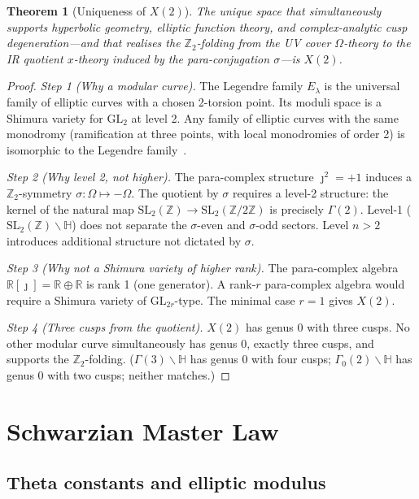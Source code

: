 \documentclass[12pt]{article}
\theoremstyle{plain}
\newtheorem{theorem}{Theorem}[section]
\theoremstyle{definition}
\numberwithin{equation}{section}
\newcommand{\R}{\mathbb{R}}
\newcommand{\Z}{\mathbb{Z}}
\newcommand{\HH}{\mathbb{H}}
\begin{document}
\begin{theorem}[Uniqueness of $X(2)$]\label{thm:X2unique}
The unique space that simultaneously supports hyperbolic geometry, elliptic function theory, and complex-analytic cusp degeneration---and that realises the $\Z_2$-folding from the UV cover $\Omega$-theory to the IR quotient $x$-theory induced by the para-conjugation $\sigma$---is $X(2)$.
\end{theorem}

\begin{proof}
\emph{Step 1 (Why a modular curve).}  The Legendre family $E_\lambda$ is the universal family of elliptic curves with a chosen 2-torsion point.  Its moduli space is a Shimura variety for $\mathrm{GL}_2$ at level 2.  Any family of elliptic curves with the same monodromy (ramification at three points, with local monodromies of order 2) is isomorphic to the Legendre family~\cite{Serre}.

\emph{Step 2 (Why level 2, not higher).}  The para-complex structure $\jmath^2=+1$ induces a $\Z_2$-symmetry $\sigma:\Omega\mapsto-\Omega$.  The quotient by $\sigma$ requires a level-2 structure: the kernel of the natural map $\mathrm{SL}_2(\Z)\to\mathrm{SL}_2(\Z/2\Z)$ is precisely $\Gamma(2)$.  Level-1 ($\mathrm{SL}_2(\Z)\backslash\HH$) does not separate the $\sigma$-even and $\sigma$-odd sectors.  Level $n>2$ introduces additional structure not dictated by $\sigma$.

\emph{Step 3 (Why not a Shimura variety of higher rank).}  The para-complex algebra $\R[\jmath]=\R\oplus\R$ is rank 1 (one generator).  A rank-$r$ para-complex algebra would require a Shimura variety of $\mathrm{GL}_{2r}$-type.  The minimal case $r=1$ gives $X(2)$.

\emph{Step 4 (Three cusps from the quotient).}  $X(2)$ has genus 0 with three cusps.  No other modular curve simultaneously has genus 0, exactly three cusps, and supports the $\Z_2$-folding.  ($\Gamma(3)\backslash\HH$ has genus 0 with four cusps; $\Gamma_0(2)\backslash\HH$ has genus 0 with two cusps; neither matches.)
\end{proof}

\section{Schwarzian Master Law}\label{sec:schwarzian}

\subsection{Theta constants and elliptic modulus}
\end{document}
